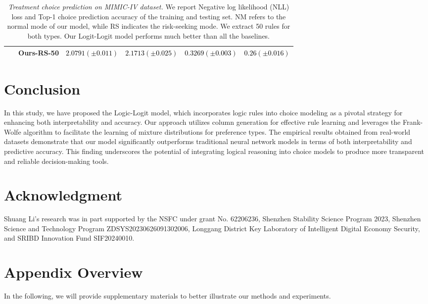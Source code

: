 \documentclass{article} %
\begin{document}
\begin{table}[h!]
\begin{tabular}{c|c|c|c|c|c}
\cline{2-6}
 ~  & Ours-RS-50 & \textcolor{black}{$2.0791(\pm0.011)$} & \textcolor{black}{$2.1713(\pm0.025)$} & \textcolor{black}{$0.3269(\pm0.003)$} & \textcolor{black}{$0.26(\pm0.016)$} \\
\bottomrule
\end{tabular}
\caption{\textit{Treatment choice prediction on MIMIC-IV dataset.} We report Negative log likelihood (NLL) loss and Top-1 choice prediction accuracy of the training and testing set. NM refers to the normal mode of our model, while RS indicates the risk-seeking mode. We extract 50 rules for both types. Our Logit-Logit model performs much better than all the baselines. }
\label{tab:MIMIC_results}
\end{table}
%
\section{Conclusion}
In this study, we have proposed the Logic-Logit model, which incorporates logic rules into choice modeling as a pivotal strategy for enhancing both interpretability and accuracy. Our approach utilizes column generation for effective rule learning and leverages the Frank-Wolfe algorithm to facilitate the learning of mixture distributions for preference types. The empirical results obtained from real-world datasets demonstrate that our model significantly outperforms traditional neural network models in terms of both interpretability and predictive accuracy. This finding underscores the potential of integrating logical reasoning into choice models to produce more transparent and reliable decision-making tools.

\section*{Acknowledgment}
Shuang Li's research was in part supported by the NSFC under grant No. 62206236, Shenzhen Stability Science Program 2023, Shenzhen Science and Technology Program ZDSYS20230626091302006, Longgang District Key Laboratory of Intelligent Digital Economy Security, and SRIBD Innovation Fund SIF20240010.








\clearpage
\newpage
\appendix
\section*{Appendix Overview}
In the following, we will provide supplementary materials to better illustrate our methods and experiments.
\end{document}
